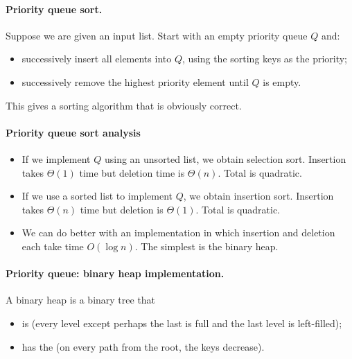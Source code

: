 \paragraph{Priority queue sort.}

Suppose we are given an input list. Start with an empty priority queue $Q$
and:
\begin{itemize}
\item successively insert all elements into $Q$, using the sorting keys as the 
priority;
\item successively remove the highest priority element until $Q$ is empty. 
\end{itemize}


This gives a sorting algorithm that is obviously correct. 

\paragraph{Priority queue sort analysis}
\begin{itemize}
\item If we implement $Q$ using an unsorted list, we obtain selection sort. 
Insertion takes $\Theta(1)$ time but deletion time is $\Theta(n)$. Total is quadratic.
\item If we use a sorted list to implement $Q$, we obtain insertion sort. 
Insertion takes $\Theta(n)$ time but deletion is $\Theta(1)$. Total is quadratic.
\item We can do better with an implementation in which insertion and deletion 
each take time $O(\log n)$. The simplest is the {binary heap}.
\end{itemize}

\paragraph{Priority queue: binary heap implementation.}
\begin{Definition}
A {binary heap} is a binary tree that 
\begin{itemize}
\item is  (every level except perhaps the last is full and 
the last level is left-filled);
\item has the  (on every path from the root, the keys decrease). 
\end{itemize}
\end{Definition}

